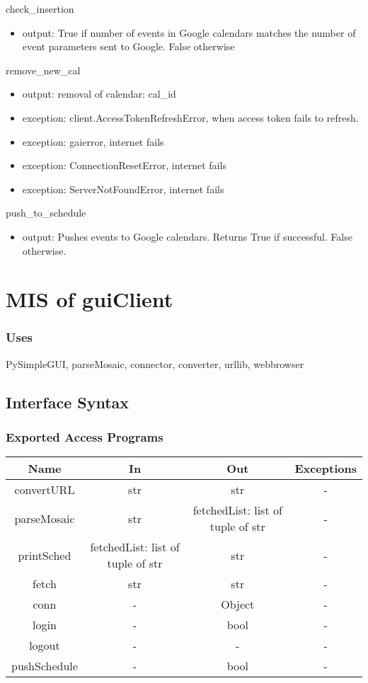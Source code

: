 \documentclass[12pt, titlepage]{article}
\begin{document}
check\_insertion
\begin{itemize}
    \item output: True if number of events in Google calendars matches the number of event parameters sent to Google. False otherwise
\end{itemize}
remove\_new\_cal
\begin{itemize}
    \item output: removal of calendar: cal\_id
    \item exception: client.AccessTokenRefreshError, when access token fails to refresh. 
    \item exception: gaierror, internet fails
    \item exception: ConnectionResetError, internet fails
    \item exception: ServerNotFoundError, internet fails
\end{itemize}
push\_to\_schedule
\begin{itemize}
    \item output: Pushes events to Google calendars. Returns True if successful. False otherwise.
\end{itemize}

\section{MIS of guiClient} \label{SecM4}
\subsubsection{Uses}
PySimpleGUI, parseMosaic, connector, converter, urllib, webbrowser


\subsection{Interface Syntax}
\subsubsection{Exported Access Programs}
\begin{tabular}[pos]{|c|c|c|c|}
	\hline
	\textbf{Name}& \textbf{In} & \textbf{Out} & \textbf{Exceptions} \\ \hline
    convertURL & str & str & - \\ \hline		
	parseMosaic & str & fetchedList: list of tuple of str & -\\ \hline
    printSched & fetchedList: list of tuple of str & str & - \\ \hline		
	fetch & str & str & - \\ \hline
	conn & - & Object & - \\ \hline	
	login & - & bool & - \\ \hline
	logout & - & - & - \\ \hline	
    pushSchedule & - & bool & - \\ \hline	
			
\end{tabular}
\end{document}
